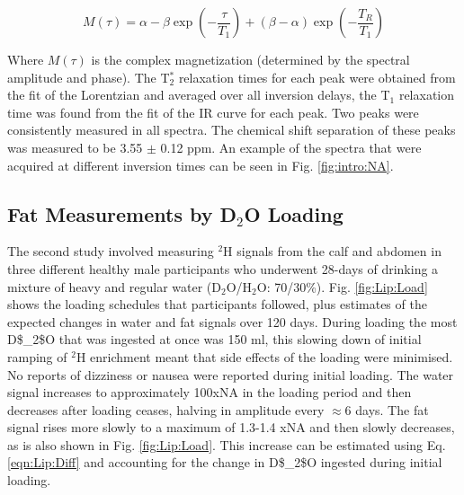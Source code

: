 \begin{equation}
    M(\tau) = \alpha - \beta\exp(-\frac{\tau}{T_1}) + (\beta - \alpha)\exp(-\frac{T_R}{T_1})
    \label{eqn:Lip:IR}
\end{equation}

Where $M(\tau)$ is the complex magnetization (determined by the spectral amplitude and phase). The T$_2^*$ relaxation times for each peak were obtained from the fit of the Lorentzian and averaged over all inversion delays, the T$_1$ relaxation time was found from the fit of the \ac{IR} curve for each peak. Two peaks were consistently measured in all spectra. The chemical shift separation of these peaks was measured to be 3.55 $\pm$ 0.12 ppm. An example of the spectra that were acquired at different inversion times can be seen in Fig. \ref{fig:intro:NA}.

\subsection{Fat Measurements by D$_2$O Loading}

The second study involved measuring $^2$H signals from the calf and abdomen in three different healthy male participants who underwent 28-days of drinking a mixture of heavy and regular water (D$_2$O/H$_2$O: 70/30\%). Fig. \ref{fig:Lip:Load} shows the loading schedules that participants followed, plus estimates of the expected changes in water and fat signals over 120 days. During loading the most \ac{D$_2$O} that was ingested at once was 150 ml, this slowing down of initial ramping of $^2$H enrichment meant that side effects of the loading were minimised. No reports of dizziness or nausea were reported during initial loading. The water signal increases to approximately 100x\ac{NA} in the loading period and then decreases after loading ceases, halving in amplitude every $\approx$6 days. The fat signal rises more slowly to a maximum of 1.3-1.4 x\ac{NA} and then slowly decreases, as is also shown in Fig. \ref{fig:Lip:Load}. This increase can be estimated using Eq. \ref{eqn:Lip:Diff} and accounting for the change in \ac{D$_2$O} ingested during initial loading.  

